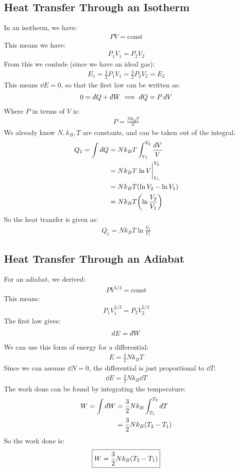 \documentclass[12pt]{article}
\newcommand{\dbar}{d\hspace*{-0.08em}\bar{}\hspace*{0.1em}}
\begin{document}
\subsection{Heat Transfer Through an Isotherm}
In an isotherm, we have:
\begin{align*}
  PV=\text{const}
\end{align*}
This means we have:
\begin{align*}
  P_1V_1=P_2V_2
\end{align*}
From this we conlude (since we have an ideal gas):
\begin{align*}
  E_1=\frac32 P_1V_1=\frac32P_2V_2=E_2
\end{align*}
This means $\dd{E}=0$, so that the first law can be written as:
\begin{align*}
  0=\dbar Q+\dbar W\implies\dbar Q=P\dd{V}
\end{align*}
Where $P$ in terms of $V$ is:
\begin{align*}
  P=\frac{Nk_BT}{V}
\end{align*}
We already know $N,k_B,T$ are constants, and can be taken out of the integral:
\begin{align*}
  Q_1=\int\dbar{Q}&=Nk_BT\int_{V_1}^{V_2}\frac{\dd{V}}{V}\\
  &=Nk_BT\eval{\ln{V}}_{V_1}^{V_2}\\
  &=Nk_BT\qty(\ln V_2-\ln V_1)\\
  &=Nk_BT\qty(\ln\frac{V_2}{V_1})
\end{align*}
So the heat transfer is given as:
\begin{align}
  \boxed{Q_1=Nk_BT\ln\frac{V_2}{V_1}}
\end{align}
\subsection{Heat Transfer Through an Adiabat}
For an adiabat, we derived:
\begin{align*}
  PV^{5/3}=\text{const}
\end{align*}
This means:
\begin{align*}
  P_1V_1^{5/3}=P_2V_2^{5/3}
\end{align*}
The first law gives:
\begin{align*}
  \dd{E}=\dbar{W}
\end{align*}
We can use this form of energy for a differential:
\begin{align*}
  E=\frac32Nk_BT
\end{align*}
Since we can assume $\dd{N}=0$, the differential is just proportional to $\dd{T}$:
\begin{align*}
  \dd{E}=\frac32Nk_B\dd{T}
\end{align*}
The work done can be found by integrating the temperature:
\begin{align*}
  W=\int\dbar{W}&=\frac32Nk_B\int_{T_1}^{T_2}\dd{T}\\
  &=\frac32Nk_B\qty(T_2-T_1)
\end{align*}
So the work done is:
\begin{align}
  \boxed{W=\frac32Nk_B\qty(T_2-T_1)}
\end{align}
\newpage
\end{document}
